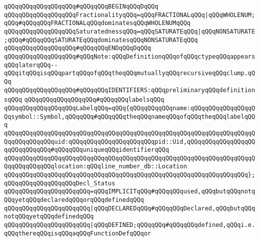 \newline
\verb|qQQqqQQqqQQqqQQqqQQq#qQQqqQQqBEGINqQQqDqQQq|\newline
\verb|qQQqqQQqqQQqqQQqqQQqFractionalityqQQq=qQQqFRACTIONALqQQq|\verb#|qQQqWHOLENUM;qQQq#\verb|#qQQqqQQqFRACTIONALqQQqdominatesqQQqWHOLENUMqQQq|\newline
\newline
\verb|qQQqqQQqqQQqqQQqqQQqSaturatednessqQQq=qQQqSATURATEqQQq|\verb#|qQQqNONSATURATE;qQQq#\verb|#qQQqqQQqSATURATEqQQqdominatesqQQqNONSATURATEqQQq|\newline
\verb|qQQqqQQqqQQqqQQqqQQq#qQQqqQQqENDqQQqDqQQq|\newline
\newline
\verb|qQQqqQQqqQQqqQQqqQQq#qQQqNote:qQQqDefinitionqQQqofqQQqctypeqQQqappearsqQQqlaterqQQq--qQQqitqQQqisqQQqpartqQQqofqQQqtheqQQqmutuallyqQQqrecursiveqQQqclump.qQQq|\newline
\newline
\verb|qQQqqQQqqQQqqQQqqQQq#qQQqqQQqIDENTIFIERS:qQQqpreliminaryqQQqdefinitionsqQQq|\newline
\newline
\verb|qQQqqQQqqQQqqQQqqQQq#qQQqqQQqlabelsqQQq|\newline
\verb|qQQqqQQqqQQqqQQqqQQqLabelqQQq=qQQq{qQQqqQQqqQQqname:qQQqqQQqqQQqqQQqqQQqsymbol::Symbol,qQQqqQQq#qQQqqQQqtheqQQqnameqQQqofqQQqtheqQQqlabelqQQq|\newline
\verb|qQQqqQQqqQQqqQQqqQQqqQQqqQQqqQQqqQQqqQQqqQQqqQQqqQQqqQQqqQQqqQQqqQQqqQQqqQQqqQQqqQQquid:qQQqqQQqqQQqqQQqqQQqqQQqpid::Uid,qQQqqQQqqQQqqQQqqQQqqQQqqQQqqQQq#qQQqqQQquniqueqQQqidentifierqQQq|\newline
\verb|qQQqqQQqqQQqqQQqqQQqqQQqqQQqqQQqqQQqqQQqqQQqqQQqqQQqqQQqqQQqqQQqqQQqqQQqqQQqqQQqqQQqlocation:qQQqline_number_db::Location|\newline
\verb|qQQqqQQqqQQqqQQqqQQqqQQqqQQqqQQqqQQqqQQqqQQqqQQqqQQqqQQqqQQqqQQqqQQq};|\newline
\newline
\verb|qQQqqQQqqQQqqQQqqQQqDecl_Status|\newline
\verb|qQQqqQQqqQQqqQQqqQQqqQQq=qQQqIMPLICITqQQq#qQQqqQQqused,qQQqbutqQQqnotqQQqyetqQQqdeclaredqQQqorqQQqdefinedqQQq|\newline
\verb|qQQqqQQqqQQqqQQqqQQqqQQq|\verb#|qQQqDECLAREDqQQq#\verb|#qQQqqQQqDeclared,qQQqbutqQQqnotqQQqyetqQQqdefinedqQQq|\newline
\verb|qQQqqQQqqQQqqQQqqQQqqQQq|\verb#|qQQqDEFINED;qQQqqQQq#\verb|#qQQqqQQqdefined,qQQqi.e.qQQqthereqQQqisqQQqaqQQqFunctionDefqQQqor|\newline
